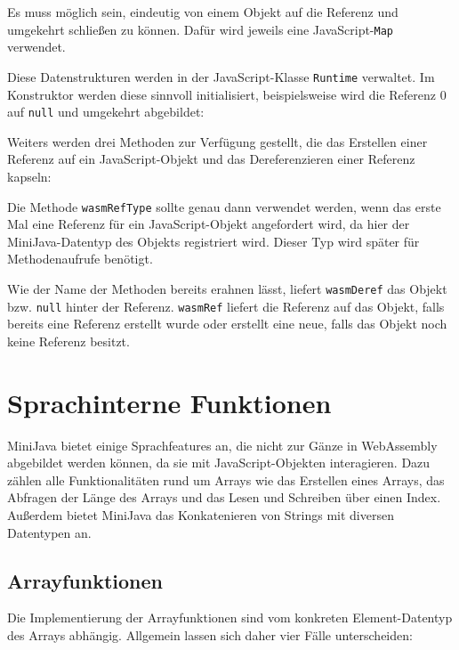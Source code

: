 Es muss möglich sein, eindeutig von einem Objekt auf die Referenz und umgekehrt schließen zu können. Dafür wird jeweils eine JavaScript-\lstinline{Map} verwendet.

Diese Datenstrukturen werden in der JavaScript-Klasse \lstinline{Runtime} verwaltet. Im Konstruktor werden diese sinnvoll initialisiert, beispielsweise wird die Referenz 0 auf \lstinline{null} und umgekehrt abgebildet:



Weiters werden drei Methoden zur Verfügung gestellt, die das Erstellen einer Referenz auf ein JavaScript-Objekt und das Dereferenzieren einer Referenz kapseln:



Die Methode \lstinline{wasmRefType} sollte genau dann verwendet werden, wenn das erste Mal eine Referenz für ein JavaScript-Objekt angefordert wird, da hier der MiniJava-Datentyp des Objekts registriert wird. Dieser Typ wird später für Methodenaufrufe benötigt.

Wie der Name der Methoden bereits erahnen lässt, liefert \lstinline{wasmDeref} das Objekt bzw. \lstinline{null} hinter der Referenz. \lstinline{wasmRef} liefert die Referenz auf das Objekt, falls bereits eine Referenz erstellt wurde oder erstellt eine neue, falls das Objekt noch keine Referenz besitzt.

\section{Sprachinterne Funktionen}

MiniJava bietet einige Sprachfeatures an, die nicht zur Gänze in WebAssembly abgebildet werden können, da sie mit JavaScript-Objekten interagieren. Dazu zählen alle Funktionalitäten rund um Arrays wie das Erstellen eines Arrays, das Abfragen der Länge des Arrays und das Lesen und Schreiben über einen Index. Außerdem bietet MiniJava das Konkatenieren von Strings mit diversen Datentypen an.

\subsection{Arrayfunktionen}

Die Implementierung der Arrayfunktionen sind vom konkreten Element-Datentyp des Arrays abhängig. Allgemein lassen sich daher vier Fälle unterscheiden:


